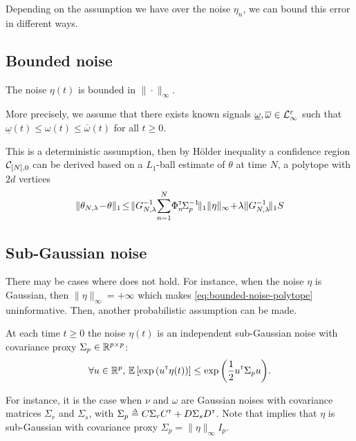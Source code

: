 Depending on the assumption we have over the noise $\eta_n$, we can bound this error in different ways.


\subsection{Bounded noise}

\begin{assumption}
\label{assumpt:bounded-noise}
\begin{leftbar}[assumptionbar]
The noise $\eta(t)$ is bounded in $\|\cdot\|_\infty$.
	
More precisely, we assume that there exists known signals $\underline{\omega},\overline{\omega}\in\mathcal{L}_{\infty}^{r}$ such that $\underline{\omega}(t)\leq \omega(t)\leq\overline{\omega}(t)$ for all $t\geq0$.
\end{leftbar}
\end{assumption}

This is a deterministic assumption, then by Hölder inequality a confidence region $\mathcal{C}_{[N],0}$ can be derived based on a $L_1$-ball estimate of $\theta$ at time $N$, \ie a polytope with $2d$ vertices
\begin{equation}
\label{eq:bounded-noise-polytope}
\|\theta_{N,\lambda}\! -\! \theta\|_1\! \leq \! \|G_{N, \lambda}^{-1}\!\sum_{n=1}^N \!\Phi_n^\transp\! \Sigma_p^{-1}\!\|_1\|\eta\|_\infty\! +\!\lambda\|G_{N, \lambda}^{-1}\!\|_1S
\end{equation}

\subsection{Sub-Gaussian noise}

There may be cases where  does not hold. For instance, when the noise $\eta$ is Gaussian, then $\|\eta\|_\infty=+\infty$ which makes \eqref{eq:bounded-noise-polytope} uninformative. Then, another probabilistic assumption can be made.

\begin{assumption}
	\label{assumpt:gaussian-noise}
	\begin{leftbar}[assumptionbar]
	At each time $t\geq0$ the noise $\eta(t)$ is an independent sub-Gaussian noise with covariance proxy $\Sigma_p \in \mathbb{R}^{p\times p}$:
	\begin{equation*}
	\forall u\in\mathbb{R}^p,\, \operatorname*{\mathbb{E}} \left[ \exp{\left( u^{\mathsf{\scriptscriptstyle T}}\eta(t)\right)}\right] \leq \exp{\left( \frac{1}{2} u^{\mathsf{\scriptscriptstyle T}}\Sigma_p u\right)}.
	\end{equation*}
	\end{leftbar}
\end{assumption}
For instance, it is the case when $\nu$ and $\omega$ are Gaussian noises with covariance matrices $\Sigma_r$ and $\Sigma_s$, with $\Sigma_p \eqdef C\Sigma_r C^\transp + D\Sigma_s D^\transp$. Note that  implies that $\eta$ is sub-Gaussian with covariance proxy $\Sigma_p=\|\eta\|_\infty I_p$.

